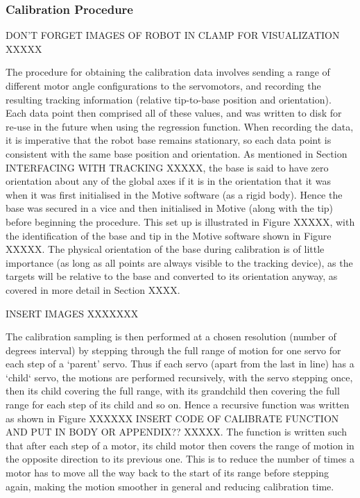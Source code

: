 \documentclass[11pt]{article}
\begin{document}
\subsubsection{Calibration Procedure}
DON'T FORGET IMAGES OF ROBOT IN CLAMP FOR VISUALIZATION XXXXX

The procedure for obtaining the calibration data involves sending a range of different motor angle configurations to the servomotors, and recording the resulting tracking information (relative tip-to-base position and orientation). Each data point then comprised all of these values, and was written to disk for re-use in the future when using the regression function. When recording the data, it is imperative that the robot base remains stationary, so each data point is consistent with the same base position and orientation. As mentioned in Section INTERFACING WITH TRACKING XXXXX, the base is said to have zero orientation about any of the global axes if it is in the orientation that it was when it was first initialised in the Motive software (as a rigid body). Hence the base was secured in a vice and then initialised in Motive (along with the tip) before beginning the procedure. This set up is illustrated in Figure XXXXX, with the identification of the base and tip in the Motive software shown in Figure XXXXX. The physical orientation of the base during calibration is of little importance (as long as all points are always visible to the tracking device), as the targets will be relative to the base and converted to its orientation anyway, as covered in more detail in Section XXXX.

INSERT IMAGES XXXXXXX


The calibration sampling is then performed at a chosen resolution (number of degrees interval) by stepping through the full range of motion for one servo for each step of a `parent' servo. Thus if each servo (apart from the last in line) has a `child` servo, the motions are performed recursively, with the servo stepping once, then its child covering the full range, with its grandchild then covering the full range for each step of its child and so on. Hence a recursive function was written as shown in Figure XXXXXX INSERT CODE OF CALIBRATE FUNCTION AND PUT IN BODY OR APPENDIX?? XXXXX. The function is written such that after each step of a motor, its child motor then covers the range of motion in the opposite direction to its previous one. This is to reduce the number of times a motor has to move all the way back to the start of its range before stepping again, making the motion smoother in general and reducing calibration time. 
\end{document}
